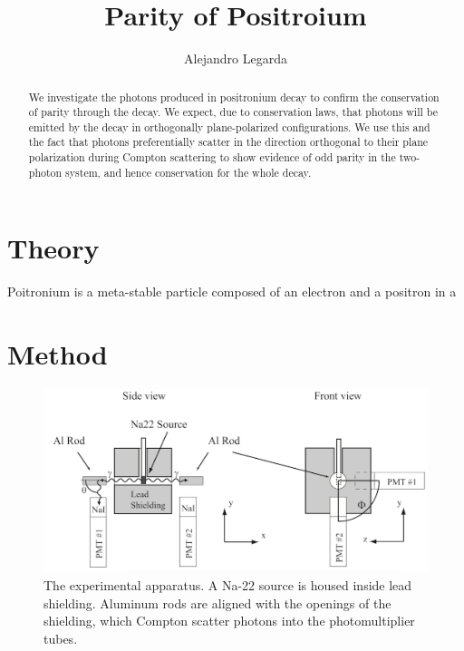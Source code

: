 \documentclass{article}
\title{Parity of Positroium}
\author{Alejandro Legarda}
\begin{document}
\raggedright
\maketitle

\begin{abstract}
We investigate the photons produced in positronium decay to confirm the conservation of parity through the decay. We expect, due to conservation laws, that photons will be emitted by the decay in orthogonally plane-polarized configurations. We use this and the fact that photons preferentially scatter in the direction orthogonal to their plane polarization during Compton scattering to show evidence of odd parity in the two-photon system, and hence conservation for the whole decay.
\end{abstract}

\tableofcontents
\newpage


\section{Theory}
Poitronium is a meta-stable particle composed of an electron and a positron in a


\section{Method}

\begin{figure}[!htb]
	\centering
	\includegraphics[scale=0.5]{apparatus.png}
  	\caption{The experimental apparatus. A Na-22 source is housed inside lead shielding. Aluminum rods are aligned with the openings of the shielding, which Compton scatter photons into the photomultiplier tubes.} 
 	\label{Apparatus}
\end{figure}
\end{document}
